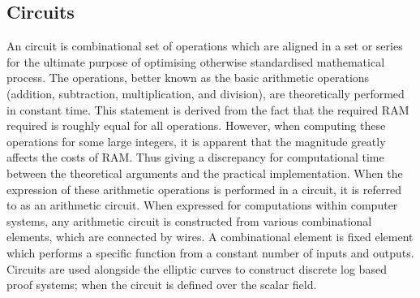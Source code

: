 \documentclass{article}
\begin{document}
\subsection{Circuits}
An circuit is combinational set of operations which are aligned in a set or series for the ultimate purpose of optimising otherwise standardised mathematical process. The operations, better known as the basic arithmetic operations (addition, subtraction, multiplication, and division), are theoretically performed in constant time. This statement is derived from the fact that the required RAM required is roughly equal for all operations. However, when computing these operations for some large integers, it is apparent that the magnitude greatly affects the costs of RAM. Thus giving a discrepancy for computational time between the theoretical arguments and the practical implementation. When the expression of these arithmetic operations is performed in a circuit, it is referred to as an arithmetic circuit. When expressed for computations within computer systems, any arithmetic circuit is constructed from various combinational elements, which are connected by wires. A combinational element is fixed element which performs a specific function from a constant number of inputs and outputs.
Circuits are used alongside the elliptic curves to construct discrete log based proof systems; when the circuit is defined over the scalar field.
\end{document}
